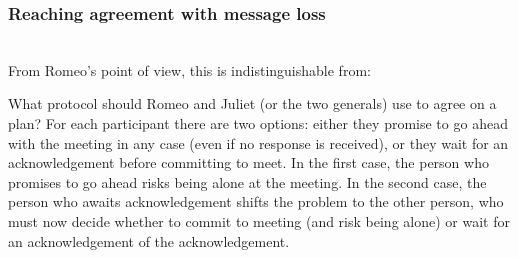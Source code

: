 \begin{frame}
    \label{s:two-generals-comms}
    \frametitle{Reaching agreement with message loss}
    \begin{center}
        \pause\\[1em]
        From Romeo's point of view, this is indistinguishable from:\\[1em]
    \end{center}
\end{frame}

What protocol should Romeo and Juliet (or the two generals) use to agree on a plan?
For each participant there are two options: either they promise to go ahead with the meeting in any case (even if no response is received), or they wait for an acknowledgement before committing to meet.
In the first case, the person who promises to go ahead risks being alone at the meeting.
In the second case, the person who awaits acknowledgement shifts the problem to the other person, who must now decide whether to commit to meeting (and risk being alone) or wait for an acknowledgement of the acknowledgement.

